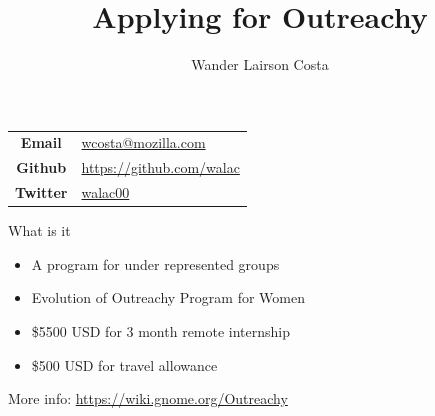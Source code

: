 \documentclass[pdf]{beamer}
\title[Outreachy]{Applying for Outreachy}
\author{{\Large Wander Lairson Costa}}
\institute{{\large Mozilla Corporation}}
\date{}
\begin{document}
\begin{frame}
  \titlepage
  \begin{center}
    \begin{tabular}{c l}
      \textbf{Email} & \href{mailto:wcosta@mozilla.com}{wcosta@mozilla.com} \\
      \textbf{Github} & \url{https://github.com/walac} \\
      \textbf{Twitter} & \href{https://twitter.com/walac00}{walac00} \\
    \end{tabular}
  \end{center}
\end{frame}

\begin{frame}{What is it}
  \begin{itemize}
    \item A program for under represented groups
    \item Evolution of Outreachy Program for Women
    \item \$5500 USD for 3 month remote internship
    \item \$500 USD for travel allowance
  \end{itemize}

  More info: \url{https://wiki.gnome.org/Outreachy}
\end{frame}
\end{document}
